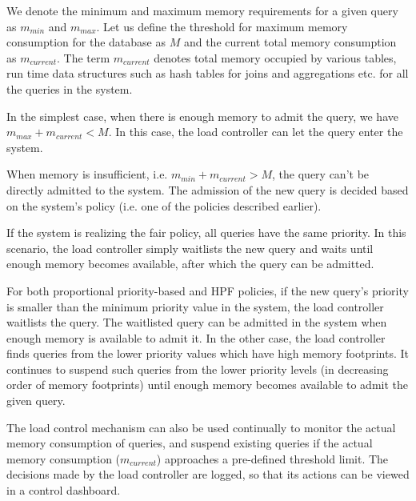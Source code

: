 We denote the minimum and maximum memory requirements for a given query as $m_{min}$ and $m_{max}$.
Let us define the threshold for maximum memory consumption for the database
as $M$ and the current total memory consumption as $m_{current}$. 
The term $m_{current}$ denotes total memory occupied by various tables, run time data structures such as hash tables for joins and aggregations etc. for all the queries in the system.

In the simplest case, when there is enough memory to admit the query, we have $m_{max} + m_{current} < M$. 
In this case, the load controller can let the query enter the system.

When memory is insufficient, i.e. $m_{min} + m_{current} > M$, the query can't be directly admitted to the system. 
The admission of the new query is decided based on the system's policy (i.e. one of the policies described earlier).

If the system is realizing the fair policy, all queries have the same priority.
In this scenario, the load controller simply waitlists the new query and waits until enough memory becomes available, after which the query can be admitted.

For both proportional priority-based and HPF policies, if the new query's priority is smaller than the minimum priority value in the system, the load controller waitlists the query. 
The waitlisted query can be admitted in the system when enough memory is available to admit it.
In the other case, the load controller finds queries from the lower priority values which have high memory footprints. 
It continues to suspend such queries from the lower priority levels (in decreasing order of memory footprints) until enough memory becomes available to admit the given query. 

The load control mechanism can also be used continually to monitor the actual memory consumption of queries, and suspend existing queries if the actual memory consumption ($m_{current}$) approaches a pre-defined threshold limit.
The decisions made by the load controller are logged, so that its actions can be viewed in a control dashboard.
